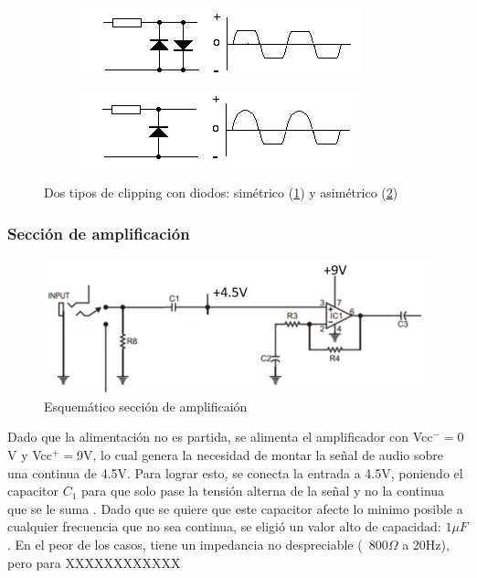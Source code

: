 \documentclass[../../main.tex]{subfiles}
\begin{document}
\begin{figure}[H]		%
	\centering
	\begin{subfigure}[b]{0.45\textwidth}
		\centering
		\includegraphics[scale=.8]{imagenes/diode_clipping_symmetrical.png}
		\caption{}
		\label{fig:ej5_diode_clipping_sym}
	\end{subfigure}
	\begin{subfigure}[b]{0.45\textwidth}
		\centering
		\includegraphics[scale=.8]{imagenes/diode_clipping_asymmetrical.png}
		\caption{ }
		\label{fig:ej5_diode_clipping_asym}
	\end{subfigure}
	\caption{Dos tipos de clipping con diodos: sim\'etrico (\ref{fig:ej5_diode_clipping_sym}) y asim\'etrico (\ref{fig:ej5_diode_clipping_asym})}
	\label{fig:ej5_diode_clipping}
\end{figure}


\subsubsection{Secci\'on de amplificaci\'on}

\begin{figure}[H]	%
	\centering
	\includegraphics[scale=1]{imagenes/esquematico_amplificacion.png}
	\caption{Esquem\'atico secci\'on de amplificai\'on}
	\label{fig:ej5_esquematico_amplificacion}
\end{figure}

Dado que la alimentaci\'on no es partida, se alimenta el amplificador con Vcc$^-=0$V y Vcc$^+=$9V, lo cual genera la necesidad de montar la se\~nal de audio sobre una continua de 4.5V. Para lograr esto, se conecta la entrada a 4.5V, poniendo el capacitor $C_1$ para que solo pase la tensi\'on alterna de la se\~nal y no la continua que se le suma . Dado que se quiere que este capacitor afecte lo minimo posible a cualquier frecuencia que no sea continua, se eligi\'o un valor alto de capacidad: $1\mu F$. En el peor de los casos, tiene un impedancia no despreciable (~800$\Omega$ a 20Hz), pero para XXXXXXXXXXXX
\end{document}
